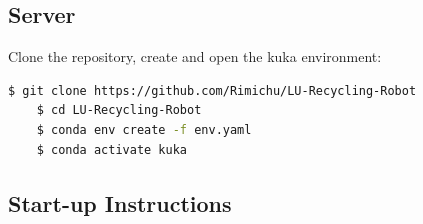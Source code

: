 \documentclass{ol-softwaremanual}
\begin{document}
\subsection{Server}

Clone the repository, create and open the kuka environment:
\begin{lstlisting}[language=bash, caption="Server Deployment"]
    $ git clone https://github.com/Rimichu/LU-Recycling-Robot
    $ cd LU-Recycling-Robot
    $ conda env create -f env.yaml
    $ conda activate kuka
\end{lstlisting}


\subsection{Start-up Instructions}
\end{document}
